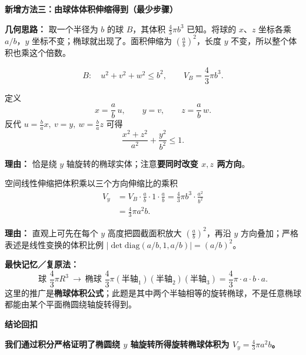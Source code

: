 \begin{proofbox}
\medskip
\textbf{\textcolor{CProof}{新增方法三：由球体体积伸缩得到（最少步骤）}}

\textbf{几何思路：} 取一个半径为 $b$ 的球 $B$，其体积 $\frac43\pi b^3$ 已知。将球的 $x$、$z$ 坐标各乘 $a/b$，$y$ 坐标不变；椭球就出现了。面积伸缩为 $\left(\frac ab\right)^2$，长度 $y$ 不变，所以整个体积也乘这个倍数。

\begin{description}[style=nextline, leftmargin=2.8em, labelsep=0.5em, itemsep=0.55em]
  \item[\textbf{步骤一（从球出发）：}]
  \[
      B:\quad u^2+v^2+w^2\le b^2,
      \qquad V_B=\frac43\pi b^3.
  \]

  \item[\textbf{步骤二（作空间伸缩）：}]
  定义
  \[
      x=\frac ab\,u,\qquad y=v,\qquad z=\frac ab\,w.
  \]
  反代 $u=\frac ba x,\ v=y,\ w=\frac ba z$ 可得
  \[
      \frac{x^2+z^2}{a^2}+\frac{y^2}{b^2}\le1.
  \]
  \par\textbf{理由：} 恰是绕 $y$ 轴旋转的椭球实体；注意\textbf{要同时改变 $x,z$ 两方向}。

  \item[\textbf{步骤三（体积伸缩）：}]
  空间线性伸缩把体积乘以三个方向伸缩比的乘积
  \[
   \begin{aligned}
      V_y&=V_B\cdot\frac ab\cdot1\cdot\frac ab
        =\frac43\pi b^3\cdot\frac{a^2}{b^2}\\
        &=\boxed{\frac43\pi a^2b}.
   \end{aligned}
  \]
  \par\textbf{理由：} 直观上可先在每个 $y$ 高度把圆截面积放大 $\left(\frac ab\right)^2$，再沿 $y$ 方向叠加；严格表述是线性变换的体积比例 $\lvert\det\mathrm{diag}(a/b,1,a/b)\rvert=(a/b)^2$。
\end{description}

\begin{center}
  \resizebox{0.95\linewidth}{!}{}
\end{center}

\textbf{最快记忆／复原法：}
\[
   \boxed{\text{球 }\frac43\pi R^3\ \longrightarrow\
          \text{椭球 }\frac43\pi(\text{半轴}_1)(\text{半轴}_2)(\text{半轴}_3)}
    =\frac43\pi\cdot a\cdot b\cdot a.
\]
这里的推广是\textbf{椭球体积公式}；此题是其中两个半轴相等的旋转椭球，不是任意椭球都能由某个平面椭圆绕轴旋转得到。

\textbf{\textcolor{CProof}{结论回扣}}

\textbf{我们通过积分严格证明了椭圆绕 $y$ 轴旋转所得旋转椭球体积为 $V_y = \frac{4}{3}\pi a^2 b$。}

\end{proofbox}
